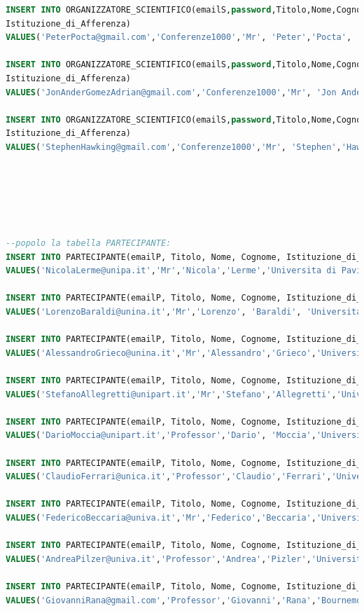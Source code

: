 \documentclass[a4page]{article}
\begin{document}
\begin{lstlisting}[language=SQL,
        deletekeywords={IDENTITY,INT},
        morekeywords={clustered},    
        framesep=10pt,
        framextopmargin=10pt]
INSERT INTO ORGANIZZATORE_SCIENTIFICO(emailS,password,Titolo,Nome,Cognome,
Istituzione_di_Afferenza)
VALUES('PeterPocta@gmail.com','Conferenze1000','Mr', 'Peter','Pocta', 'University of Zilina');

INSERT INTO ORGANIZZATORE_SCIENTIFICO(emailS,password,Titolo,Nome,Cognome,
Istituzione_di_Afferenza)
VALUES('JonAnderGomezAdrian@gmail.com','Conferenze1000','Mr', 'Jon Ander','Gomez Adrian', 'University of Alicante');

INSERT INTO ORGANIZZATORE_SCIENTIFICO(emailS,password,Titolo,Nome,Cognome,
Istituzione_di_Afferenza)
VALUES('StephenHawking@gmail.com','Conferenze1000','Mr', 'Stephen','Hawking', 'University of Cambridge');






--popolo la tabella PARTECIPANTE:
INSERT INTO PARTECIPANTE(emailP, Titolo, Nome, Cognome, Istituzione_di_Afferenza)
VALUES('NicolaLerme@unipa.it','Mr','Nicola','Lerme','Universita di Pavia');

INSERT INTO PARTECIPANTE(emailP, Titolo, Nome, Cognome, Istituzione_di_Afferenza)
VALUES('LorenzoBaraldi@unina.it','Mr','Lorenzo', 'Baraldi', 'Universita degli Studi di Napoli Federico II');

INSERT INTO PARTECIPANTE(emailP, Titolo, Nome, Cognome, Istituzione_di_Afferenza)
VALUES('AlessandroGrieco@unina.it','Mr','Alessandro','Grieco','Universita degli Studi di Napoli Federico II');

INSERT INTO PARTECIPANTE(emailP, Titolo, Nome, Cognome, Istituzione_di_Afferenza)
VALUES('StefanoAllegretti@unipart.it','Mr','Stefano','Allegretti','Universita Parthenope');

INSERT INTO PARTECIPANTE(emailP, Titolo, Nome, Cognome, Istituzione_di_Afferenza)
VALUES('DarioMoccia@unipart.it','Professor','Dario', 'Moccia','Universita Parthenope');

INSERT INTO PARTECIPANTE(emailP, Titolo, Nome, Cognome, Istituzione_di_Afferenza)
VALUES('ClaudioFerrari@unica.it','Professor','Claudio','Ferrari','Universita di Catania');

INSERT INTO PARTECIPANTE(emailP, Titolo, Nome, Cognome, Istituzione_di_Afferenza)
VALUES('FedericoBeccaria@univa.it','Mr','Federico','Beccaria','Universita Vanvitelli');

INSERT INTO PARTECIPANTE(emailP, Titolo, Nome, Cognome, Istituzione_di_Afferenza)
VALUES('AndreaPilzer@univa.it','Professor','Andrea','Pizler','Universita Vanvitelli');

INSERT INTO PARTECIPANTE(emailP, Titolo, Nome, Cognome, Istituzione_di_Afferenza)
VALUES('GiovanniRana@gmail.com','Professor','Giovanni','Rana','Bournemouth University');


\end{lstlisting}
\end{document}
